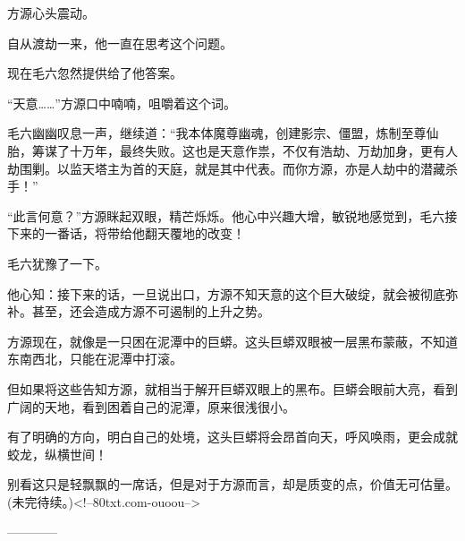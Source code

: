 \begin{this_body}
方源心头震动。

自从渡劫一来，他一直在思考这个问题。

现在毛六忽然提供给了他答案。

“天意……”方源口中喃喃，咀嚼着这个词。

毛六幽幽叹息一声，继续道：“我本体魔尊幽魂，创建影宗、僵盟，炼制至尊仙胎，筹谋了十万年，最终失败。这也是天意作祟，不仅有浩劫、万劫加身，更有人劫围剿。以监天塔主为首的天庭，就是其中代表。而你方源，亦是人劫中的潜藏杀手！”

“此言何意？”方源眯起双眼，精芒烁烁。他心中兴趣大增，敏锐地感觉到，毛六接下来的一番话，将带给他翻天覆地的改变！

毛六犹豫了一下。

他心知：接下来的话，一旦说出口，方源不知天意的这个巨大破绽，就会被彻底弥补。甚至，还会造成方源不可遏制的上升之势。

方源现在，就像是一只困在泥潭中的巨蟒。这头巨蟒双眼被一层黑布蒙蔽，不知道东南西北，只能在泥潭中打滚。

但如果将这些告知方源，就相当于解开巨蟒双眼上的黑布。巨蟒会眼前大亮，看到广阔的天地，看到困着自己的泥潭，原来很浅很小。

有了明确的方向，明白自己的处境，这头巨蟒将会昂首向天，呼风唤雨，更会成就蛟龙，纵横世间！

别看这只是轻飘飘的一席话，但是对于方源而言，却是质变的点，价值无可估量。(未完待续。)<!--80txt.com-ouoou-->

------------

\end{this_body}


